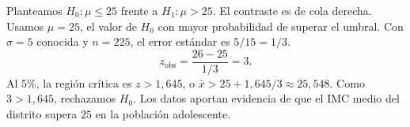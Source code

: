Planteamos $H_0:\mu\le25$ frente a $H_1:\mu>25$. El contraste es de cola derecha. Usamos $\mu=25$, el valor de $H_0$ con mayor probabilidad de superar el umbral. Con $\sigma=5$ conocida y $n=225$, el error estándar es $5/15=1/3$.
\[
z_{\mathrm{obs}}=\frac{26-25}{1/3}=3.
\]
Al $5\%$, la región crítica es $z>1{,}645$, o $\bar x>25+1{,}645/3\approx25{,}548$. Como $3>1{,}645$, rechazamos $H_0$. Los datos aportan evidencia de que el IMC medio del distrito supera $25$ en la población adolescente.
